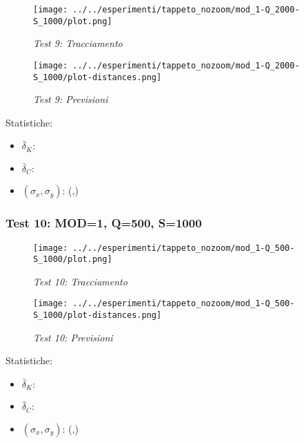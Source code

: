 \begin{figure}[hb]
\centering
\texttt{[image: ../../esperimenti/tappeto\_nozoom/mod\_1-Q\_2000-S\_1000/plot.png]}
\caption{\textit{Test 9: Tracciamento}\label{fig:Test 9}}
\end{figure}

\begin{figure}[hb]
\centering
\texttt{[image: ../../esperimenti/tappeto\_nozoom/mod\_1-Q\_2000-S\_1000/plot-distances.png]}
\caption{\textit{Test 9: Previsioni}\label{fig:Test 9b}}
\end{figure}

Statistiche:
\begin{itemize}
\item \begin{math} \bar \delta_K:  \end{math}
\item \begin{math} \bar \delta_C:  \end{math}
\item \begin{math}(\sigma_x,\sigma_y)\end{math}: (,)
\end{itemize}

\newpage
\subsubsection{Test 10: MOD=1, Q=500, S=1000}

\begin{figure}[hb]
\centering
\texttt{[image: ../../esperimenti/tappeto\_nozoom/mod\_1-Q\_500-S\_1000/plot.png]}
\caption{\textit{Test 10: Tracciamento}\label{fig:Test 10}}
\end{figure}

\begin{figure}[hb]
\centering
\texttt{[image: ../../esperimenti/tappeto\_nozoom/mod\_1-Q\_500-S\_1000/plot-distances.png]}
\caption{\textit{Test 10: Previsioni}\label{fig:Test 10b}}
\end{figure}

Statistiche:
\begin{itemize}
\item \begin{math} \bar \delta_K:  \end{math}
\item \begin{math} \bar \delta_C:  \end{math}
\item \begin{math}(\sigma_x,\sigma_y)\end{math}: (,)
\end{itemize}

